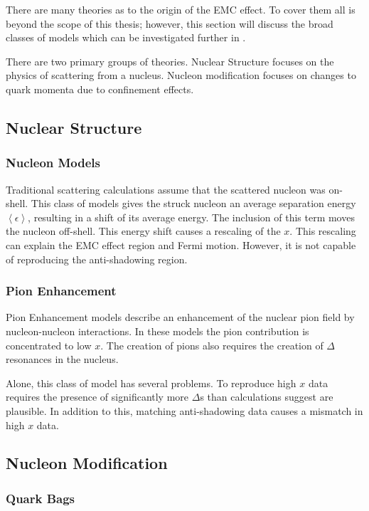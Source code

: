 There are many theories as to the origin of the EMC effect. To cover them all is beyond the scope of this thesis; however, this section will discuss the broad classes of models which can be investigated further in \cite{Norton,GST,HenSRC}.

There are two primary groups of theories. Nuclear Structure focuses on the physics of scattering from a nucleus. Nucleon modification focuses on changes to quark momenta due to confinement effects.

\subsection{Nuclear Structure}

\subsubsection{Nucleon Models}

Traditional scattering calculations assume that the scattered nucleon was on-shell. This class of models gives the struck nucleon an average separation energy $\left\langle\epsilon\right\rangle$, resulting in a shift of its average energy. The inclusion of this term moves the nucleon off-shell. This energy shift causes a rescaling of the $x$. This rescaling can explain the EMC effect region and Fermi motion. However, it is not capable of reproducing the anti-shadowing region.

\subsubsection{Pion Enhancement}

Pion Enhancement models describe an enhancement of the nuclear pion field by nucleon-nucleon interactions. In these models the pion contribution is concentrated to low $x$. The creation of pions also requires the creation of $\Delta$ resonances in the nucleus. 

Alone, this class of model has several problems. To reproduce high $x$ data requires the presence of significantly more $\Delta$s than calculations suggest are plausible. In addition to this, matching anti-shadowing data causes a mismatch in high $x$ data.

\subsection{Nucleon Modification}

\subsubsection{Quark Bags}

